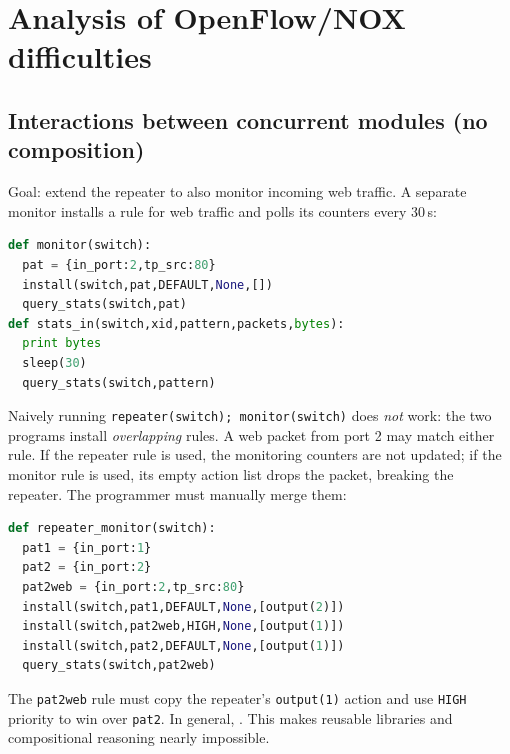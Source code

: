 \section{Analysis of OpenFlow/NOX difficulties}
\subsection{Interactions between concurrent modules (no composition)}
Goal: extend the repeater to also monitor incoming web traffic. A separate monitor installs a rule for web traffic and polls its counters every 30\,s:
\begin{lstlisting}[language=Python]
def monitor(switch):
  pat = {in_port:2,tp_src:80}
  install(switch,pat,DEFAULT,None,[])
  query_stats(switch,pat)
def stats_in(switch,xid,pattern,packets,bytes):
  print bytes
  sleep(30)
  query_stats(switch,pattern)
\end{lstlisting}
Naively running \texttt{repeater(switch); monitor(switch)} does \emph{not} work: the two programs install \emph{overlapping} rules. A web packet from port 2 may match either rule. If the repeater rule is used, the monitoring counters are not updated; if the monitor rule is used, its empty action list drops the packet, breaking the repeater. The programmer must manually merge them:
\begin{lstlisting}[language=Python]
def repeater_monitor(switch):
  pat1 = {in_port:1}
  pat2 = {in_port:2}
  pat2web = {in_port:2,tp_src:80}
  install(switch,pat1,DEFAULT,None,[output(2)])
  install(switch,pat2web,HIGH,None,[output(1)])
  install(switch,pat2,DEFAULT,None,[output(1)])
  query_stats(switch,pat2web)
\end{lstlisting}
The \texttt{pat2web} rule must copy the repeater's \texttt{output(1)} action and use \texttt{HIGH} priority to win over \texttt{pat2}. In general, . This makes reusable libraries and compositional reasoning nearly impossible.

